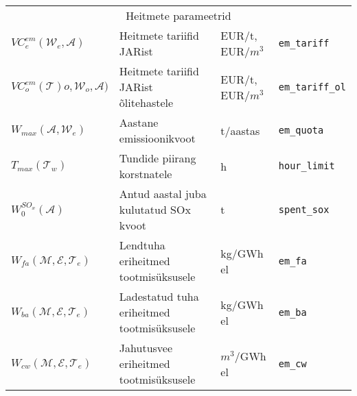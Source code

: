 \begin{landscape}
\begin{longtable}{l l l l}
\\ \multicolumn{4}{c}{Heitmete parameetrid} \\
$\mathit{VC}^{em}_e(\mathcal{W}_e,\mathcal{A})$&Heitmete tariifid JARist & EUR/t, EUR/$m^3$& \texttt{em\_tariff}\\
$\mathit{VC}^{em}_o(\mathcal{T})o,\mathcal{W}_o,\mathcal{A})$&Heitmete tariifid JARist õlitehastele& EUR/t, EUR/$m^3$& \texttt{em\_tariff\_ol}\\
$\mathit{W}_{max}(\mathcal{A},\mathcal{W}_e)$& Aastane emissioonikvoot& t/aastas& \texttt{em\_quota} \\
$\mathit{T}_{max}(\mathcal{T}_w)$ & Tundide piirang korstnatele & h & \texttt{hour\_limit} \\
$\mathit{W}^{SO_x}_0(\mathcal{A})$& Antud aastal juba kulutatud SOx kvoot& t & \texttt{spent\_sox}\\
$\mathit{W}_{fa}(\mathcal{M},\mathcal{E},\mathcal{T}_e)$& Lendtuha eriheitmed tootmisüksusele& kg/GWh el& \texttt{em\_fa} \\
$\mathit{W}_{ba}(\mathcal{M},\mathcal{E},\mathcal{T}_e)$& Ladestatud tuha eriheitmed tootmisüksusele& kg/GWh el& \texttt{em\_ba} \\
$\mathit{W}_{cw}(\mathcal{M},\mathcal{E},\mathcal{T}_e)$& Jahutusvee eriheitmed tootmisüksusele& $m^3$/GWh el& \texttt{em\_cw} \\


\end{longtable}
\end{landscape}
